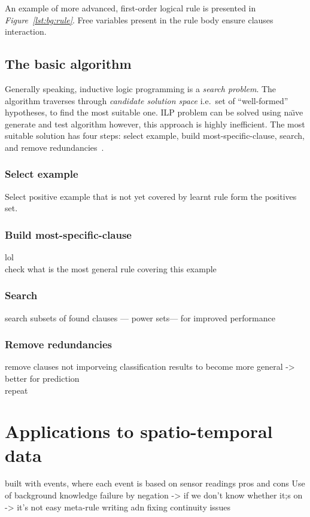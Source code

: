 \documentclass[12pt, a4paper, pdflatex, leqno, twoside, openright]{report}
\begin{document}
An example of more advanced, first-order logical rule is presented in \emph{Figure~\ref{lst:bg:rule}}. Free variables present in the rule body ensure clauses interaction.

    \subsection{The basic algorithm}
Generally speaking, inductive logic programming is a \emph{search problem}. The algorithm traverses through \emph{candidate solution space} i.e.\ set of ``well-formed'' hypotheses, to find the most suitable one. ILP problem can be solved using na\"{\i}ve generate and test algorithm however, this approach is highly inefficient. The most suitable solution has four steps: select example, build most-specific-clause, search, and remove redundancies~\citep{muggleton1994inductive}.

      \subsubsection{Select example}
Select positive example that is not yet covered by learnt rule form the positives set.

      \subsubsection{Build most-specific-clause}
lol\\
check what is the most general rule covering this example

      \subsubsection{Search}
search subsets of found clauses --- power sets--- for improved performance

      \subsubsection{Remove redundancies}
remove clauses not imporveing classification results to become more general -> better for prediction\\
repeat


  \section{Applications to spatio-temporal data}
built with events, where each event is based on sensor readings
pros and cons
Use of background knowledge
failure by negation -> if we don't know whether it;s on -> it's not
easy meta-rule writing adn fixing continuity issues
\end{document}
